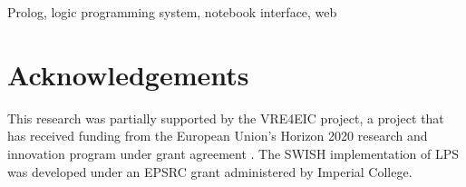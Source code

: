 \documentclass{tlp}
\begin{document}
\begin{keywords}
Prolog, logic programming system, notebook interface, web
\end{keywords}










\section*{Acknowledgements}

This research was partially supported by the VRE4EIC project, a project
that has received funding from the European Union's Horizon 2020
research and innovation program under grant agreement . The SWISH implementation of LPS was developed under an EPSRC
grant administered by Imperial College.


\end{document}
